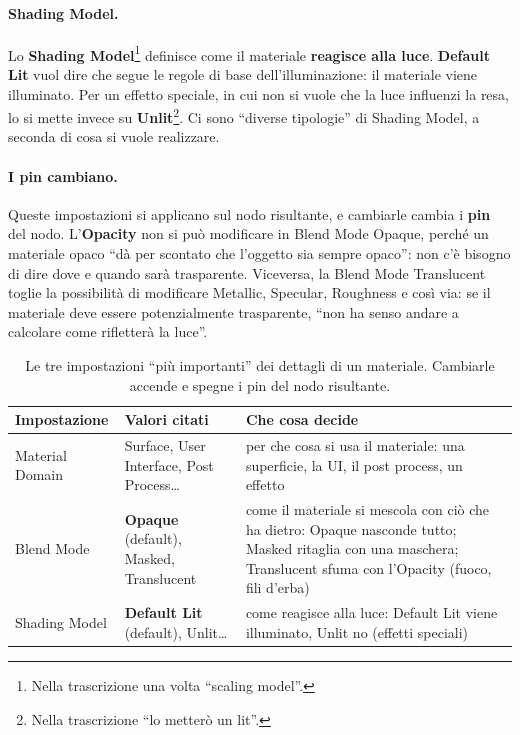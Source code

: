 \paragraph{Shading Model.} Lo \textbf{Shading Model}\footnote{Nella trascrizione una
volta ``scaling model''.} definisce come il materiale \textbf{reagisce alla luce}.
\textbf{Default Lit} vuol dire che segue le regole di base dell'illuminazione: il
materiale viene illuminato. Per un effetto speciale, in cui non si vuole che la luce
influenzi la resa, lo si mette invece su \textbf{Unlit}\footnote{Nella trascrizione
``lo metterò un lit''.}. Ci sono ``diverse tipologie'' di Shading Model, a seconda di
cosa si vuole realizzare.

\paragraph{I pin cambiano.} Queste impostazioni si applicano sul nodo risultante, e
cambiarle cambia i \textbf{pin} del nodo. L'\textbf{Opacity} non si può modificare in
Blend Mode Opaque, perché un materiale opaco ``dà per scontato che l'oggetto sia sempre
opaco'': non c'è bisogno di dire dove e quando sarà trasparente. Viceversa, la Blend
Mode Translucent toglie la possibilità di modificare Metallic, Specular, Roughness e
così via: se il materiale deve essere potenzialmente trasparente, ``non ha senso andare
a calcolare come rifletterà la luce''.

\begin{table}[htbp]
\centering
\small
\begin{tabular}{@{}p{2.6cm}p{3.3cm}p{7.1cm}@{}}
\toprule
\textbf{Impostazione} & \textbf{Valori citati} & \textbf{Che cosa decide} \\
\midrule
Material Domain & Surface, User Interface, Post Process\ldots & per che cosa si usa
  il materiale: una superficie, la UI, il post process, un effetto \\
Blend Mode & \textbf{Opaque} (default), Masked, Translucent & come il materiale si
  mescola con ciò che ha dietro: Opaque nasconde tutto; Masked ritaglia con una
  maschera; Translucent sfuma con l'Opacity (fuoco, fili d'erba) \\
Shading Model & \textbf{Default Lit} (default), Unlit\ldots & come reagisce alla luce:
  Default Lit viene illuminato, Unlit no (effetti speciali) \\
\bottomrule
\end{tabular}
\caption{Le tre impostazioni ``più importanti'' dei dettagli di un materiale. Cambiarle
accende e spegne i pin del nodo risultante.}
\label{ue3:tab:dettagli}
\end{table}

